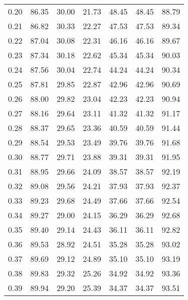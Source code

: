 \begin{tabular}{|c|c|c|c|c|c|c|}
      0.20 &     86.35 &     30.00 &      21.73 &   48.45 &      48.45 &         88.79 \\
      0.21 &     86.82 &     30.33 &      22.27 &   47.53 &      47.53 &         89.34 \\
      0.22 &     87.04 &     30.08 &      22.31 &   46.16 &      46.16 &         89.67 \\
      0.23 &     87.34 &     30.18 &      22.62 &   45.34 &      45.34 &         90.03 \\
      0.24 &     87.56 &     30.04 &      22.74 &   44.24 &      44.24 &         90.34 \\
      0.25 &     87.81 &     29.85 &      22.87 &   42.96 &      42.96 &         90.69 \\
      0.26 &     88.00 &     29.82 &      23.04 &   42.23 &      42.23 &         90.94 \\
      0.27 &     88.16 &     29.64 &      23.11 &   41.32 &      41.32 &         91.17 \\
      0.28 &     88.37 &     29.65 &      23.36 &   40.59 &      40.59 &         91.44 \\
      0.29 &     88.54 &     29.53 &      23.49 &   39.76 &      39.76 &         91.68 \\
      0.30 &     88.77 &     29.71 &      23.88 &   39.31 &      39.31 &         91.95 \\
      0.31 &     88.95 &     29.66 &      24.09 &   38.57 &      38.57 &         92.19 \\
      0.32 &     89.08 &     29.56 &      24.21 &   37.93 &      37.93 &         92.37 \\
      0.33 &     89.23 &     29.68 &      24.49 &   37.66 &      37.66 &         92.54 \\
      0.34 &     89.27 &     29.00 &      24.15 &   36.29 &      36.29 &         92.68 \\
      0.35 &     89.40 &     29.14 &      24.43 &   36.11 &      36.11 &         92.82 \\
      0.36 &     89.53 &     28.92 &      24.51 &   35.28 &      35.28 &         93.02 \\
      0.37 &     89.69 &     29.12 &      24.89 &   35.10 &      35.10 &         93.19 \\
      0.38 &     89.83 &     29.32 &      25.26 &   34.92 &      34.92 &         93.36 \\
      0.39 &     89.94 &     29.20 &      25.39 &   34.37 &      34.37 &         93.51 \\

\end{tabular}
